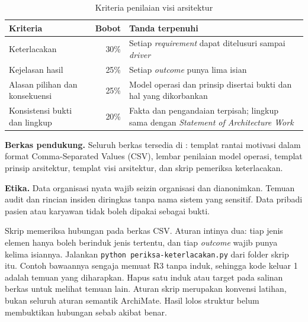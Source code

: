 \begin{table}[!htb]
  \centering
  \caption{Kriteria penilaian visi arsitektur}
  \label{tab:ch03-kriteria-aktivitas}
  \small
  \begin{tabularx}{\textwidth}{>{\raggedright\arraybackslash}p{3.8cm}r>{\raggedright\arraybackslash}X}
    \hline
    \textbf{Kriteria} & \textbf{Bobot} & \textbf{Tanda terpenuhi} \\
    \hline
    Keterlacakan & 30\% & Setiap \textit{requirement} dapat ditelusuri sampai \textit{driver} \\
    \hline
    Kejelasan hasil & 25\% & Setiap \textit{outcome} punya lima isian \\
    \hline
    Alasan pilihan dan konsekuensi & 25\% & Model operasi dan prinsip disertai bukti dan hal yang dikorbankan \\
    \hline
    Konsistensi bukti dan lingkup & 20\% & Fakta dan pengandaian terpisah; lingkup sama dengan \textit{Statement of Architecture Work} \\
    \hline
  \end{tabularx}
\end{table}

\textbf{Berkas pendukung.} Seluruh berkas tersedia di : templat
rantai motivasi dalam format Comma-Separated Values (CSV), lembar penilaian model operasi,
templat prinsip arsitektur, templat visi arsitektur, dan skrip pemeriksa keterlacakan.

\textbf{Etika.} Data organisasi nyata wajib seizin organisasi dan dianonimkan. Temuan
audit dan rincian insiden diringkas tanpa nama sistem yang sensitif. Data pribadi pasien
atau karyawan tidak boleh dipakai sebagai bukti.

\begin{pendalaman}[title={Pendalaman Teknis (opsional): Memeriksa Keterlacakan dengan Skrip}]
  Skrip  memeriksa hubungan pada berkas
  CSV. Aturan intinya dua: tiap jenis elemen hanya boleh berinduk jenis tertentu, dan tiap
  \textit{outcome} wajib punya kelima isiannya. Jalankan \texttt{python
  periksa-keterlacakan.py} dari folder skrip itu. Contoh bawaannya sengaja memuat R3 tanpa
  induk, sehingga kode keluar 1 adalah temuan yang diharapkan. Hapus satu induk atau target
  pada salinan berkas untuk melihat temuan lain. Aturan skrip merupakan konvensi latihan,
  bukan seluruh aturan semantik ArchiMate. Hasil lolos struktur belum membuktikan hubungan
  sebab akibat benar.
\end{pendalaman}

